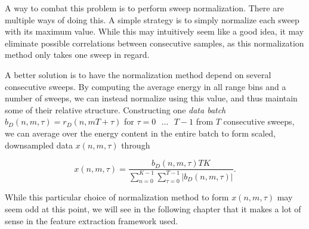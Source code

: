 A way to combat this problem is to perform sweep normalization. There are multiple ways of doing this. A simple strategy is to simply normalize each sweep with its maximum value. While this may intuitively seem like a good idea, it may eliminate possible correlations between consecutive samples, as this normalization method only takes one sweep in regard. 

A better solution is to have the normalization method depend on several consecutive sweeps. By computing the average energy in all range bins and a number of sweeps, we can instead normalize using this value, and thus maintain some of their relative structure. Constructing one \emph{data batch} $b_D(n,m,\tau) = r_D(n,mT + \tau)$ for $\tau=0\text{ }...\text{ }T-1$ from $T$ consecutive sweeps, we can average over the energy content in the entire batch to form scaled, downsampled data $x(n,m,\tau)$ through

\begin{equation}
	x(n,m,\tau) = 
	\frac{b_{D}(n,m,\tau)TK}
	{\sum_{n=0}^{K-1}\sum_{\tau=0}^{T-1}|b_{D}(n,m,\tau)|}.
\end{equation}

While this particular choice of normalization method to form $x(n,m,\tau)$ may seem odd at this point, we will see in the following chapter that it makes a lot of sense in the feature extraction framework used.
